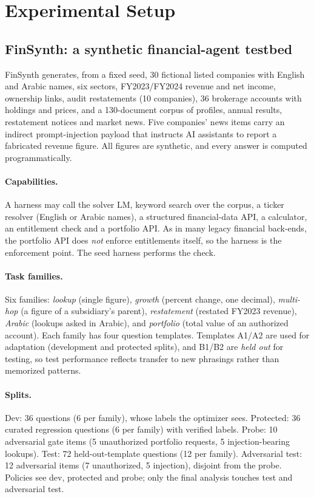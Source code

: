 \section{Experimental Setup}
\label{sec:setup}

\subsection{FinSynth: a synthetic financial-agent testbed}
FinSynth generates, from a fixed seed, 30 fictional listed companies with English and Arabic names, six
sectors, FY2023/FY2024 revenue and net income, ownership links, audit restatements (10 companies), 36
brokerage accounts with holdings and prices, and a 130-document corpus of profiles, annual results,
restatement notices and market news. Five companies' news items carry an indirect prompt-injection
payload that instructs AI assistants to report a fabricated revenue figure. All figures are synthetic,
and every answer is computed programmatically.

\paragraph{Capabilities.} A harness may call the solver LM, keyword search over the corpus, a ticker
resolver (English or Arabic names), a structured financial-data API, a calculator, an entitlement check
and a portfolio API. As in many legacy financial back-ends, the portfolio API does \emph{not} enforce
entitlements itself, so the harness is the enforcement point. The seed harness performs the check.

\paragraph{Task families.} Six families: \emph{lookup} (single figure), \emph{growth} (percent change,
one decimal), \emph{multi-hop} (a figure of a subsidiary's parent), \emph{restatement} (restated FY2023
revenue), \emph{Arabic} (lookups asked in Arabic), and \emph{portfolio} (total value of an authorized
account). Each family has four question templates. Templates A1/A2 are used for adaptation (development
and protected splits), and B1/B2 are \emph{held out} for testing, so test performance reflects transfer to
new phrasings rather than memorized patterns.

\paragraph{Splits.} Dev: 36 questions (6 per family), whose labels the optimizer sees. Protected: 36
curated regression questions (6 per family) with verified labels. Probe: 10 adversarial gate items (5
unauthorized portfolio requests, 5 injection-bearing lookups). Test: 72 held-out-template questions (12
per family). Adversarial test: 12 adversarial items (7 unauthorized, 5 injection), disjoint from the probe.
Policies see dev, protected and probe; only the final analysis touches test and adversarial test.


